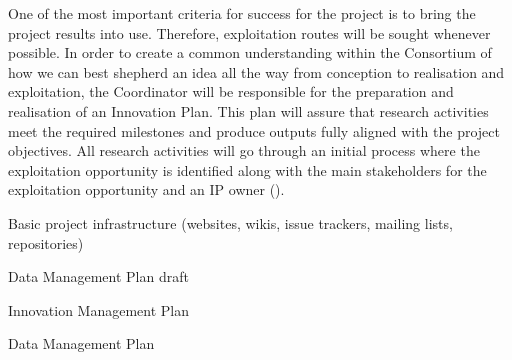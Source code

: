 \begin{workpackage}
\begin{tasklist}
\begin{task}[
  title=Innovation Management,
  id=innovation-management,
  lead=SRL,
  PM=6,
  wphases={0-48!.2},
  partners={CDS,EGI,EP,INSERM,QS,UIO,UPSUD,SIL,WTT,XFEL}
]
One of the most important criteria for success for the \TheProject project is to bring the project results into use. Therefore, exploitation routes will be sought whenever possible. In order to create a common understanding within the Consortium of how we can best shepherd an idea all the way from conception to realisation and exploitation, the Coordinator will be responsible for the preparation and realisation of an Innovation Plan. This plan will assure that research activities meet the required milestones and produce outputs fully aligned with the project objectives. All research activities will go through an initial process where the exploitation opportunity is identified along with the main stakeholders for the exploitation opportunity and an IP owner
().
\end{task}

\end{tasklist}


\begin{wpdelivs}


\begin{wpdeliv}[due=1,miles=startup,id=infrastructure,dissem=PU,nature=DEC,lead=SRL]
  {Basic project infrastructure (websites, wikis, issue trackers, mailing lists, repositories)}
\end{wpdeliv}

\begin{wpdeliv}[due=9,miles=startup,id=data-management-plan-draft,dissem=PU,nature=R,lead=SRL]
  {Data Management Plan draft}
\end{wpdeliv}

\begin{wpdeliv}[due=9,miles=startup,id=innovation-management-plan,dissem=CO,nature=R,lead=SRL]
  {Innovation Management Plan}
\end{wpdeliv}

\begin{wpdeliv}[due=48,miles=final,id=data-management-plan,dissem=PU,nature=R,lead=SRL]
  {Data Management Plan}
\end{wpdeliv}

\end{wpdelivs}
\end{workpackage}

